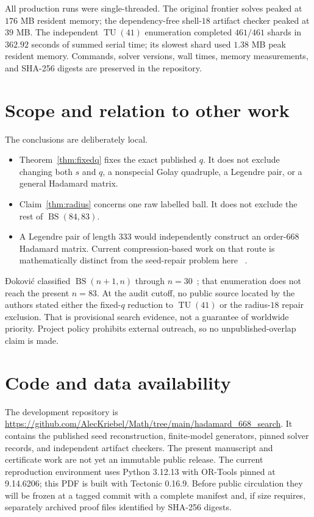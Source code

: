 \documentclass[11pt]{article}
\newcommand{\BS}{\operatorname{BS}}
\newcommand{\TU}{\operatorname{TU}}
\begin{document}
All production runs were single-threaded.  The original frontier solves
peaked at $176$ MB resident memory; the dependency-free shell-$18$ artifact
checker peaked at $39$ MB.  The independent $\TU(41)$ enumeration completed
$461/461$ shards in $362.92$ seconds of summed serial time; its slowest shard
used $1.38$ MB peak resident memory.  Commands, solver versions, wall times,
memory measurements, and SHA-256 digests are preserved in the repository.

\section{Scope and relation to other work}

The conclusions are deliberately local.
\begin{itemize}
\item Theorem~\ref{thm:fixedq} fixes the exact published $q$.  It does not
exclude changing both $s$ and $q$, a nonspecial Golay quadruple, a Legendre
pair, or a general Hadamard matrix.
\item Claim~\ref{thm:radius} concerns one raw labelled ball.  It does not
exclude the rest of $\BS(84,83)$.
\item A Legendre pair of length $333$ would independently construct an
order-$668$ Hadamard matrix.  Current compression-based work on that route
is mathematically distinct from the seed-repair problem here
~\cite{kotsireas-pq2,chojecki}.
\end{itemize}

Đoković classified $\BS(n+1,n)$ through $n=30$~\cite{djokovic-bs}; that
enumeration does not reach the present $n=83$.  At the audit cutoff, no
public source located by the authors stated either the fixed-$q$ reduction
to $\TU(41)$ or the radius-$18$ repair exclusion.  That is provisional
search evidence, not a guarantee of worldwide priority.  Project policy
prohibits external outreach, so no unpublished-overlap claim is made.

\section*{Code and data availability}

The development repository is
\url{https://github.com/AlecKriebel/Math/tree/main/hadamard_668_search}.
It contains the published seed reconstruction, finite-model generators,
pinned solver records, and independent artifact checkers.  The present
manuscript and certificate work are not yet an immutable public release.
The current reproduction environment uses Python 3.12.13 with OR-Tools
pinned at 9.14.6206; this PDF is built with Tectonic 0.16.9.
Before public circulation they will be frozen at a tagged commit with a
complete manifest and, if size requires, separately archived proof files
identified by SHA-256 digests.
\end{document}
